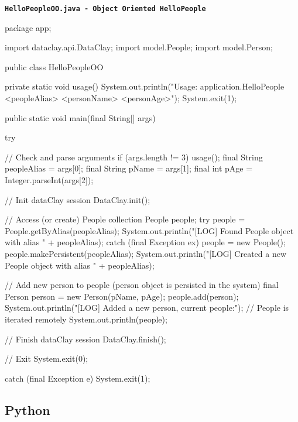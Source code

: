 \begin{tBox}
\texttt{\bfseries\textcolor{basecolor}{HelloPeopleOO.java - Object Oriented HelloPeople}}
\begin{java}
package app;

import dataclay.api.DataClay;
import model.People;
import model.Person;

public class HelloPeopleOO {
    private static void usage() {
        System.out.println("Usage: application.HelloPeople <peopleAlias> <personName> <personAge>");
        System.exit(1);
    }   

    public static void main(final String[] args) {
        try {
            // Check and parse arguments
            if (args.length != 3) {
                usage();
            }   
            final String peopleAlias = args[0];
            final String pName = args[1];
            final int pAge = Integer.parseInt(args[2]);

            // Init dataClay session
            DataClay.init();

            // Access (or create) People collection
            People people;
            try {
                people = People.getByAlias(peopleAlias);
                System.out.println("[LOG] Found People object with alias " + peopleAlias);
            } catch (final Exception ex) {
                people = new People();
                people.makePersistent(peopleAlias);
                System.out.println("[LOG] Created a new People object with alias " + peopleAlias);
            }   

            // Add new person to people (person object is persisted in the system)
            final Person person = new Person(pName, pAge);
            people.add(person);
            System.out.println("[LOG] Added a new person, current people:");
            // People is iterated remotely
            System.out.println(people);

            // Finish dataClay session
            DataClay.finish();

            // Exit
            System.exit(0);
        } catch (final Exception e) {
            System.exit(1);
        }   
    }   
}
\end{java}
\end{tBox}


\subsection{Python}
\label{sec:PythonFirstApp}

